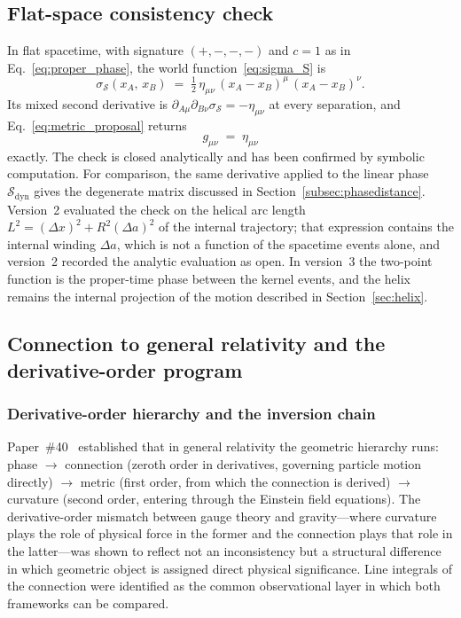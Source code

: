 \documentclass[%
 reprint, amsmath,amssymb, aps, prb, ]{revtex4-2}
\numberwithin{equation}{section}
\begin{document}
\subsection{Flat-space consistency check}
\label{subsec:flatcheck}

In flat spacetime, with signature $(+,-,-,-)$ and $c = 1$ as in Eq.~\eqref{eq:proper_phase}, the world function~\eqref{eq:sigma_S} is
\begin{equation}
\sigma_{\mathcal{S}}(x_A,\, x_B) \;=\; \tfrac12\,\eta_{\mu\nu}\,(x_A - x_B)^\mu\,(x_A - x_B)^\nu.
\label{eq:S_flat}
\end{equation}
Its mixed second derivative is $\partial_{A\mu}\partial_{B\nu}\sigma_{\mathcal{S}} = -\eta_{\mu\nu}$ at every separation, and Eq.~\eqref{eq:metric_proposal} returns
\begin{equation}
g_{\mu\nu} \;=\; \eta_{\mu\nu}
\label{eq:arc_length}
\end{equation}
exactly. The check is closed analytically and has been confirmed by symbolic computation. For comparison, the same derivative applied to the linear phase $\mathcal{S}_{\mathrm{dyn}}$ gives the degenerate matrix discussed in Section~\ref{subsec:phasedistance}. Version~2 evaluated the check on the helical arc length $L^2 = (\Delta x)^2 + R^2(\Delta a)^2$ of the internal trajectory; that expression contains the internal winding $\Delta a$, which is not a function of the spacetime events alone, and version~2 recorded the analytic evaluation as open. In version~3 the two-point function is the proper-time phase between the kernel events, and the helix remains the internal projection of the motion described in Section~\ref{sec:helix}.

\subsection{Connection to general relativity and the derivative-order program}
\label{subsec:GR_connection}

\subsubsection{Derivative-order hierarchy and the inversion chain}
\label{subsubsec:derivative_order}

Paper~\#40~\cite{hanamura40} established that in general relativity the geometric hierarchy runs: phase $\to$ connection (zeroth order in derivatives, governing particle motion directly) $\to$ metric (first order, from which the connection is derived) $\to$ curvature (second order, entering through the Einstein field equations). The derivative-order mismatch between gauge theory and gravity---where curvature plays the role of physical force in the former and the connection plays that role in the latter---was shown to reflect not an inconsistency but a structural difference in which geometric object is assigned direct physical significance. Line integrals of the connection were identified as the common observational layer in which both frameworks can be compared.
\end{document}
